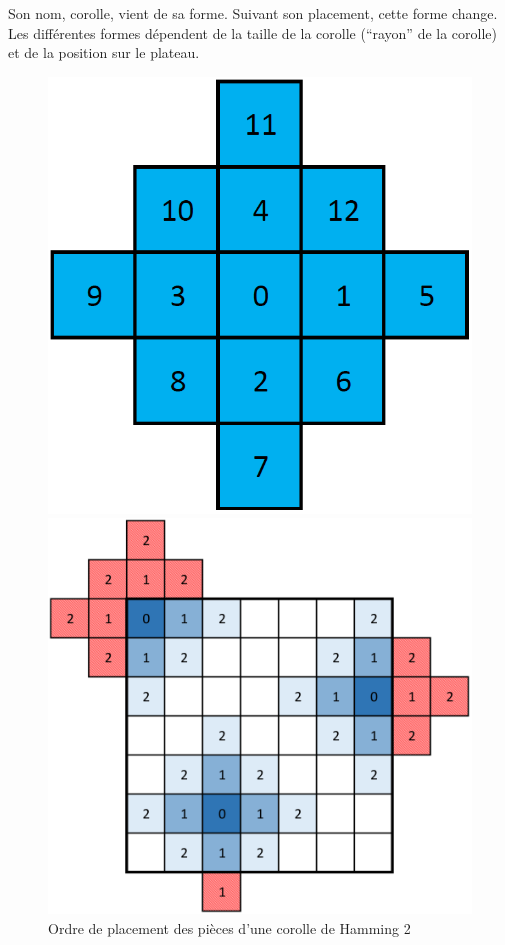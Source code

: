 	Son nom, corolle, vient de sa forme. Suivant son placement, cette forme change. Les différentes formes dépendent de la taille de la corolle (\enquote{rayon} de la corolle) et de la position sur le plateau.
		
	\begin{figure}[H]
		\begin{minipage}[t]{0.33\textwidth}
			\includegraphics[width=\linewidth]{images/corolle_simple.png}
			\caption{Ordre de placement des pièces d'une corolle de Hamming 2}\label{fig:corolle}
		\end{minipage}\hfill
		\begin{minipage}[t]{0.66\textwidth}
			\includegraphics[width=\linewidth]{images/corolle_formes.png}

\end{minipage}
\end{figure}
